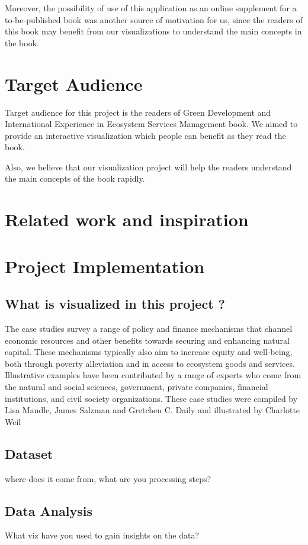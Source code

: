 \documentclass[a4paper]{article}
\begin{document}
Moreover, the possibility of use of this application as an online supplement for a to-be-published book was another source of motivation for us, since the readers
of this book may benefit from our visualizations to understand the main concepts in the book.

\section{Target Audience}

Target audience for this project is the readers of Green Development and International Experience in Ecosystem Services Management book.
We aimed to provide an interactive visualization which people can benefit as they read the book.

Also, we believe that our visualization project will help the readers understand the main concepts of the book rapidly.
\section{Related work and inspiration}

\section{Project Implementation}

\subsection{What is visualized in this project ?}
The case studies survey a range of policy and finance mechanisms that channel economic resources and other benefits towards securing and enhancing natural capital. 
These mechanisms typically also aim to increase equity and well-being, both through poverty alleviation and in access to ecosystem goods and services. 
Illustrative examples have been contributed by a range of experts who come from the natural and social sciences, government, private companies, financial institutions, 
and civil society organizations. These case studies were compiled by Lisa Mandle, James Salzman and Gretchen C. Daily and illustrated by Charlotte Weil

\subsection{Dataset}
where does it come from, what are you processing steps?

\subsection{Data Analysis}
What viz have you used to gain insights on the data?
\end{document}
